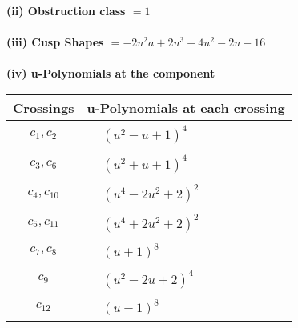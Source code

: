 \documentclass[1p]{elsarticle_modified}
\theoremstyle{definition}
\begin{document}
\flushleft \textbf{(ii) Obstruction class $= 1$}\\~\\
\flushleft \textbf{(iii) Cusp Shapes $= -2 u^2 a+2 u^3+4 u^2-2 u-16$}\\~\\
\newpage\renewcommand{\arraystretch}{1}
\flushleft \textbf{(iv) u-Polynomials at the component}\newline \\
\begin{tabular}{m{50pt}|m{274pt}}
Crossings & \hspace{64pt}u-Polynomials at each crossing \\
\hline $$\begin{aligned}c_{1},c_{2}\end{aligned}$$&$\begin{aligned}
&(u^2- u+1)^4
\end{aligned}$\\
\hline $$\begin{aligned}c_{3},c_{6}\end{aligned}$$&$\begin{aligned}
&(u^2+u+1)^4
\end{aligned}$\\
\hline $$\begin{aligned}c_{4},c_{10}\end{aligned}$$&$\begin{aligned}
&(u^4-2 u^2+2)^2
\end{aligned}$\\
\hline $$\begin{aligned}c_{5},c_{11}\end{aligned}$$&$\begin{aligned}
&(u^4+2 u^2+2)^2
\end{aligned}$\\
\hline $$\begin{aligned}c_{7},c_{8}\end{aligned}$$&$\begin{aligned}
&(u+1)^8
\end{aligned}$\\
\hline $$\begin{aligned}c_{9}\end{aligned}$$&$\begin{aligned}
&(u^2-2 u+2)^4
\end{aligned}$\\
\hline $$\begin{aligned}c_{12}\end{aligned}$$&$\begin{aligned}
&(u-1)^8
\end{aligned}$\\
\hline
\end{tabular}\\~\\
\end{document}
